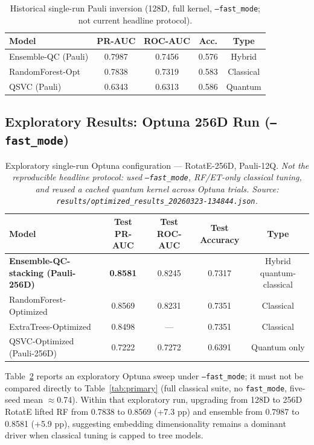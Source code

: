 \documentclass[10pt,twocolumn]{article}
\begin{document}
\begin{table}[t]
\centering
\caption{Historical single-run Pauli inversion (128D, full kernel, \texttt{--fast\_mode}; not current headline protocol).}
\label{tab:legacy_primary}
\begin{tabular}{@{}lcccc@{}}
\toprule
\textbf{Model} & \textbf{PR-AUC} & \textbf{ROC-AUC} & \textbf{Acc.} & \textbf{Type} \\
\midrule
Ensemble-QC (Pauli) & 0.7987 & 0.7456 & 0.576 & Hybrid \\
RandomForest-Opt & 0.7838 & 0.7319 & 0.583 & Classical \\
QSVC (Pauli) & 0.6343 & 0.6313 & 0.586 & Quantum \\
\bottomrule
\end{tabular}
\end{table}

\subsection{Exploratory Results: Optuna 256D Run (\texttt{--fast\_mode})}

\begin{table}[t]
\centering
\caption{Exploratory single-run Optuna configuration --- RotatE-256D, Pauli-12Q. \textit{Not the reproducible headline protocol: used \texttt{--fast\_mode}, RF/ET-only classical tuning, and reused a cached quantum kernel across Optuna trials. Source: \texttt{results/optimized\_results\_20260323-134844.json}.}}
\label{tab:extended}
\begin{tabular}{@{}lcccc@{}}
\toprule
\textbf{Model} & \textbf{Test PR-AUC} & \textbf{Test ROC-AUC} & \textbf{Test Accuracy} & \textbf{Type} \\
\midrule
\textbf{Ensemble-QC-stacking (Pauli-256D)} & \textbf{0.8581} & 0.8245 & 0.7317 & Hybrid quantum-classical \\
RandomForest-Optimized & 0.8569 & 0.8231 & 0.7351 & Classical \\
ExtraTrees-Optimized & 0.8498 & --- & 0.7351 & Classical \\
QSVC-Optimized (Pauli-256D) & 0.7222 & 0.7272 & 0.6391 & Quantum only \\
\bottomrule
\end{tabular}
\end{table}

Table~\ref{tab:extended} reports an exploratory Optuna sweep under \texttt{--fast\_mode}; it must not be compared directly to Table~\ref{tab:primary} (full classical suite, no \texttt{fast\_mode}, five-seed mean $\approx$0.74). Within that exploratory run, upgrading from 128D to 256D RotatE lifted RF from 0.7838 to 0.8569 (+7.3 pp) and ensemble from 0.7987 to 0.8581 (+5.9 pp), suggesting embedding dimensionality remains a dominant driver when classical tuning is capped to tree models.
\end{document}
